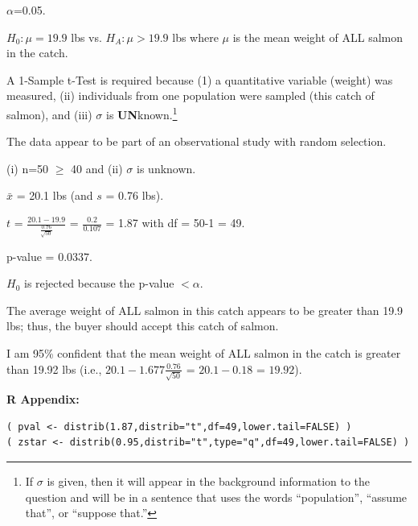\documentclass[10pt,openany]{book}\usepackage[]{graphicx}\usepackage[]{color}
\makeatletter
\newenvironment{kframe}{%
 \def\at@end@of@kframe{}%
 \ifinner\ifhmode%
  \def\at@end@of@kframe{\end{minipage}}%
  \begin{minipage}{\columnwidth}%
 \fi\fi%
 \def\FrameCommand##1{\hskip\@totalleftmargin \hskip-\fboxsep
 \colorbox{shadecolor}{##1}\hskip-\fboxsep
     \hskip-\linewidth \hskip-\@totalleftmargin \hskip\columnwidth}%
 \MakeFramed {\advance\hsize-\width
   \@totalleftmargin\z@ \linewidth\hsize
   \@setminipage}}%
 {\par\unskip\endMakeFramed%
 \at@end@of@kframe}
\newenvironment{knitrout}{}{} %
\makeatother
\begin{document}
\begin{Enumerate}
    \item $\alpha$=0.05.
    \item $H_{0}:\mu=19.9$ lbs vs. $H_{A}:\mu >19.9$ lbs where $\mu$ is the mean weight of ALL salmon in the catch.
    \item A 1-Sample t-Test is required because (1) a quantitative variable (weight) was measured, (ii) individuals from one population were sampled (this catch of salmon), and (iii) $\sigma$ is \textbf{UN}known.\footnote{If $\sigma$ is given, then it will appear in the background information to the question and will be in a sentence that uses the words ``population'', ``assume that'', or ``suppose that.''}
    \item The data appear to be part of an observational study with random selection.
    \item (i) n=50 $\geq$ 40 and (ii) $\sigma$ is unknown.
    \item $\bar{x}$ = 20.1 lbs (and $s$ = 0.76 lbs).
    \item $t$ = $\frac{20.1-19.9}{\frac{0.76}{\sqrt{50}}}$ = $\frac{0.2}{0.107}$ = 1.87 with df = 50-1 = 49.
    \item p-value = $0.0337$.
    \item $H_{0}$ is rejected because the p-value $< \alpha$.
    \item The average weight of ALL salmon in this catch appears to be greater than 19.9 lbs; thus, the buyer should accept this catch of salmon.
    \item I am 95\% confident that the mean weight of ALL salmon in the catch is greater than 19.92 lbs (i.e., $20.1-1.677\frac{0.76}{\sqrt{50}}$ = $20.1-0.18$ = $19.92$).
\end{Enumerate}

\vspace{-6pt}
\begin{minipage}{\textwidth}
\textbf{R Appendix:}
\vspace{-6pt}
\begin{knitrout}
\color{fgcolor}\begin{kframe}
\begin{verbatim}
( pval <- distrib(1.87,distrib="t",df=49,lower.tail=FALSE) )
( zstar <- distrib(0.95,distrib="t",type="q",df=49,lower.tail=FALSE) )
\end{verbatim}
\end{kframe}
\end{knitrout}
\end{minipage}
\end{document}
